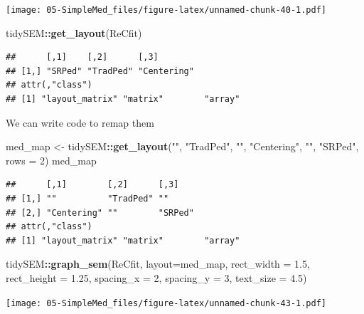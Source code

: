 \documentclass[
  11pt,
]{book}
\newenvironment{Shaded}{\begin{snugshade}}{\end{snugshade}}
\newcommand{\AttributeTok}[1]{\textcolor[rgb]{0.27,0.27,0.27}{#1}}
\newcommand{\DecValTok}[1]{\textcolor[rgb]{0.06,0.06,0.06}{#1}}
\newcommand{\FloatTok}[1]{\textcolor[rgb]{0.06,0.06,0.06}{#1}}
\newcommand{\FunctionTok}[1]{\textcolor[rgb]{0.27,0.27,0.27}{\textbf{#1}}}
\newcommand{\NormalTok}[1]{#1}
\newcommand{\OtherTok}[1]{\textcolor[rgb]{0.37,0.37,0.37}{#1}}
\newcommand{\SpecialCharTok}[1]{\textcolor[rgb]{0.43,0.43,0.43}{\textbf{#1}}}
\newcommand{\StringTok}[1]{\textcolor[rgb]{0.5,0.5,0.5}{#1}}
\begin{document}
\texttt{[image: 05-SimpleMed\_files/figure-latex/unnamed-chunk-40-1.pdf]}

\begin{Shaded}
\begin{Highlighting}[]
\NormalTok{tidySEM}\SpecialCharTok{::}\FunctionTok{get\_layout}\NormalTok{(ReCfit)}
\end{Highlighting}
\end{Shaded}

\begin{verbatim}
##      [,1]    [,2]      [,3]       
## [1,] "SRPed" "TradPed" "Centering"
## attr(,"class")
## [1] "layout_matrix" "matrix"        "array"
\end{verbatim}

We can write code to remap them

\begin{Shaded}
\begin{Highlighting}[]
\NormalTok{med\_map }\OtherTok{\textless{}{-}}\NormalTok{ tidySEM}\SpecialCharTok{::}\FunctionTok{get\_layout}\NormalTok{(}\StringTok{""}\NormalTok{, }\StringTok{"TradPed"}\NormalTok{, }\StringTok{""}\NormalTok{, }\StringTok{"Centering"}\NormalTok{, }\StringTok{""}\NormalTok{, }\StringTok{"SRPed"}\NormalTok{,}
    \AttributeTok{rows =} \DecValTok{2}\NormalTok{)}
\NormalTok{med\_map}
\end{Highlighting}
\end{Shaded}

\begin{verbatim}
##      [,1]        [,2]      [,3]   
## [1,] ""          "TradPed" ""     
## [2,] "Centering" ""        "SRPed"
## attr(,"class")
## [1] "layout_matrix" "matrix"        "array"
\end{verbatim}

\begin{Shaded}
\begin{Highlighting}[]
\NormalTok{tidySEM}\SpecialCharTok{::}\FunctionTok{graph\_sem}\NormalTok{(ReCfit, }\AttributeTok{layout=}\NormalTok{med\_map,  }\AttributeTok{rect\_width =} \FloatTok{1.5}\NormalTok{, }\AttributeTok{rect\_height =} \FloatTok{1.25}\NormalTok{, }\AttributeTok{spacing\_x =} \DecValTok{2}\NormalTok{, }\AttributeTok{spacing\_y =} \DecValTok{3}\NormalTok{, }\AttributeTok{text\_size =} \FloatTok{4.5}\NormalTok{)}
\end{Highlighting}
\end{Shaded}

\texttt{[image: 05-SimpleMed\_files/figure-latex/unnamed-chunk-43-1.pdf]}
\end{document}
